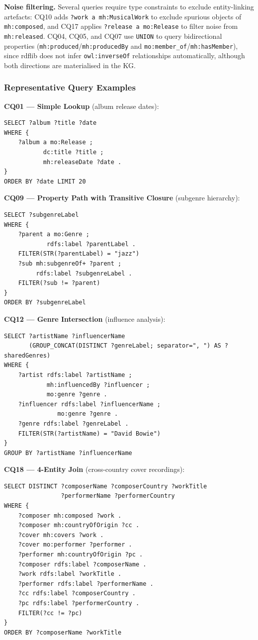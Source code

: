 \documentclass[11pt,a4paper]{article}
\begin{document}
\textbf{Noise filtering.} Several queries require type constraints to exclude entity-linking artefacts: CQ10 adds \texttt{?work a mh:MusicalWork} to exclude spurious objects of \texttt{mh:composed}, and CQ17 applies \texttt{?release a mo:Release} to filter noise from \texttt{mh:released}. CQ04, CQ05, and CQ07 use \texttt{UNION} to query bidirectional properties (\texttt{mh:produced}/\texttt{mh:producedBy} and \texttt{mo:member\_of}/\texttt{mh:hasMember}), since rdflib does not infer \texttt{owl:inverseOf} relationships automatically, although both directions are materialised in the KG.

\subsubsection{Representative Query Examples}

\textbf{CQ01 --- Simple Lookup} (album release dates):
\begin{lstlisting}
SELECT ?album ?title ?date
WHERE {
    ?album a mo:Release ;
           dc:title ?title ;
           mh:releaseDate ?date .
}
ORDER BY ?date LIMIT 20
\end{lstlisting}

\textbf{CQ09 --- Property Path with Transitive Closure} (subgenre hierarchy):
\begin{lstlisting}
SELECT ?subgenreLabel
WHERE {
    ?parent a mo:Genre ;
            rdfs:label ?parentLabel .
    FILTER(STR(?parentLabel) = "jazz")
    ?sub mh:subgenreOf+ ?parent ;
         rdfs:label ?subgenreLabel .
    FILTER(?sub != ?parent)
}
ORDER BY ?subgenreLabel
\end{lstlisting}

\textbf{CQ12 --- Genre Intersection} (influence analysis):
\begin{lstlisting}
SELECT ?artistName ?influencerName
       (GROUP_CONCAT(DISTINCT ?genreLabel; separator=", ") AS ?sharedGenres)
WHERE {
    ?artist rdfs:label ?artistName ;
            mh:influencedBy ?influencer ;
            mo:genre ?genre .
    ?influencer rdfs:label ?influencerName ;
               mo:genre ?genre .
    ?genre rdfs:label ?genreLabel .
    FILTER(STR(?artistName) = "David Bowie")
}
GROUP BY ?artistName ?influencerName
\end{lstlisting}

\textbf{CQ18 --- 4-Entity Join} (cross-country cover recordings):
\begin{lstlisting}
SELECT DISTINCT ?composerName ?composerCountry ?workTitle
                ?performerName ?performerCountry
WHERE {
    ?composer mh:composed ?work .
    ?composer mh:countryOfOrigin ?cc .
    ?cover mh:covers ?work .
    ?cover mo:performer ?performer .
    ?performer mh:countryOfOrigin ?pc .
    ?composer rdfs:label ?composerName .
    ?work rdfs:label ?workTitle .
    ?performer rdfs:label ?performerName .
    ?cc rdfs:label ?composerCountry .
    ?pc rdfs:label ?performerCountry .
    FILTER(?cc != ?pc)
}
ORDER BY ?composerName ?workTitle
\end{lstlisting}
\end{document}
